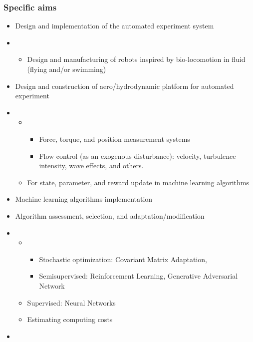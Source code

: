 \documentclass[12pt, a4paper]{article}
\providecommand{\tightlist}{%
  \setlength{\itemsep}{0pt}\setlength{\parskip}{0pt}}
\begin{document}
\hypertarget{specific-aims}{%
\subsubsection{Specific aims}\label{specific-aims}}

\begin{itemize}
\item
  Design and implementation of the automated experiment system
\item
  \begin{itemize}
  \tightlist
  \item
    Design and manufacturing of robots inspired by bio-locomotion in
    fluid (flying and/or swimming)
  \end{itemize}
\item
  Design and construction of aero/hydrodynamic platform for automated
  experiment
\item
  \begin{itemize}
  \item
    \begin{itemize}
    \tightlist
    \item
      Force, torque, and position measurement systems
    \item
      Flow control (as an exogenous disturbance): velocity, turbulence
      intensity, wave effects, and others.
    \end{itemize}
  \item
    For state, parameter, and reward update in machine learning
    algorithms
  \end{itemize}
\item
  Machine learning algorithms implementation
\item
  Algorithm assessment, selection, and adaptation/modification
\item
  \begin{itemize}
  \item
    \begin{itemize}
    \tightlist
    \item
      Stochastic optimization: Covariant Matrix Adaptation,
    \item
      Semisupervised: Reinforcement Learning, Generative Adversarial
      Network
    \end{itemize}
  \item
    Supervised: Neural Networks
  \item
    Estimating computing costs
  \end{itemize}
\item

\end{itemize}
\end{document}
